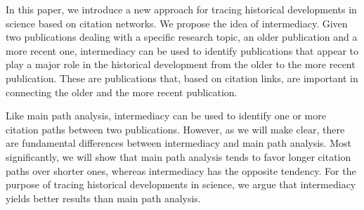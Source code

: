 \documentclass[9pt,twocolumn,twoside,lineno]{pnas-alt}
\theoremstyle{definition}
\begin{document}
In this paper, we introduce a new approach for tracing historical developments in science based on citation networks. We propose the idea of intermediacy. Given two publications dealing with a specific research topic, an older publication and a more recent one, intermediacy can be used to identify publications that appear to play a major role in the historical development from the older to the more recent publication. These are publications that, based on citation links, are important in connecting the older and the more recent publication.

Like main path analysis, intermediacy can be used to identify one or more citation paths between two publications. However, as we will make clear, there are fundamental differences between intermediacy and main path analysis. Most significantly, we will show that main path analysis tends to favor longer citation paths over shorter ones, whereas intermediacy has the opposite tendency. For the purpose of tracing historical developments in science, we argue that intermediacy yields better results than main path analysis.

\end{document}
